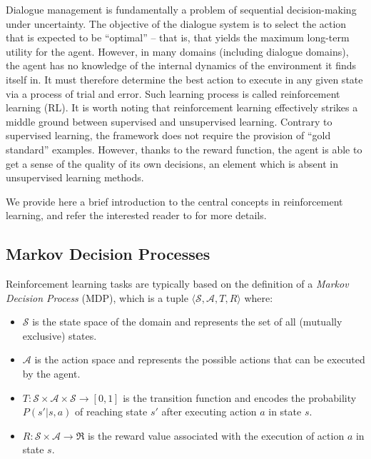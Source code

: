 Dialogue management is fundamentally a problem of sequential decision-making under uncertainty. The objective of the dialogue system is to select the action that is expected to be ``optimal'' -- that is, that yields the maximum long-term utility for the agent. However, in many domains (including dialogue domains), the agent has no knowledge of the internal dynamics of the environment it finds itself in.  It must therefore determine the best action to execute in any given state via a process of trial and error.  Such learning process is called reinforcement learning (RL).  It is worth noting that reinforcement learning effectively strikes a middle ground between supervised and unsupervised learning.  Contrary to supervised learning, the framework does not require the provision of ``gold standard'' examples.  However,  thanks to the reward function, the agent is able to get a sense of the quality of its own decisions, an element which is absent in unsupervised learning methods.  

We provide here a brief introduction to the central concepts in reinforcement learning, and refer the interested reader to \cite{citeulike:112017} for more details. 

\subsection{Markov Decision Processes}
\label{sec:mdp}

Reinforcement learning tasks are typically based on the definition of a \textit{Markov Decision Process} (MDP), which is a tuple $\langle \mathcal{S}, \mathcal{A}, T, R \rangle$ where:
\begin{itemize}
\item $\mathcal{S}$ is the state space of the domain and represents the set of all (mutually exclusive) states.
\item $\mathcal{A}$ is the action space and represents the possible actions that can be executed by the agent.
\item $T: \mathcal{S} \times \mathcal{A} \times \mathcal{S} \rightarrow [0,1]$ is the transition function and encodes the probability $P(s'|s,a)$ of reaching state $s'$ after executing action $a$ in state $s$.
\item $R:  \mathcal{S} \times \mathcal{A} \rightarrow \Re$ is the reward value associated with the execution of action $a$ in state $s$.
\end{itemize}

